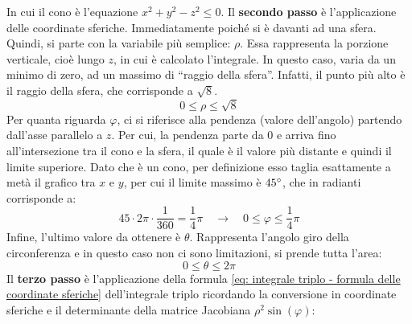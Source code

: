 \documentclass[a4paper]{article}
\newcommand{\dquotes}[1]{``#1''}
\begin{document}
	\noindent
	In cui il cono è l'equazione $x^{2} + y^{2} - z^{2} \le 0$. Il \textbf{secondo passo} è l'applicazione delle coordinate sferiche. Immediatamente poiché si è davanti ad una sfera. Quindi, si parte con la variabile più semplice: $\rho$. Essa rappresenta la porzione verticale, cioè lungo $z$, in cui è calcolato l'integrale. In questo caso, varia da un minimo di zero, ad un massimo di \dquotes{raggio della sfera}. Infatti, il punto più alto è il raggio della sfera, che corrisponde a $\sqrt{8}$.
	\begin{equation*}
		0 \le \rho \le \sqrt{8}
	\end{equation*}
	Per quanta riguarda $\varphi$, ci si riferisce alla pendenza (valore dell'angolo) partendo dall'asse parallelo a $z$. Per cui, la pendenza parte da $0$ e arriva fino all'intersezione tra il cono e la sfera, il quale è il valore più distante e quindi il limite superiore. Dato che è un cono, per definizione esso taglia esattamente a metà il grafico tra $x$ e $y$, per cui il limite massimo è $45\degree$, che in radianti corrisponde a:
	\begin{equation*}
		45 \cdot 2\pi \cdot \dfrac{1}{360} = \dfrac{1}{4}\pi 
		\hspace{1em} \longrightarrow \hspace{1em}
		0 \le \varphi \le \dfrac{1}{4}\pi
	\end{equation*}
	Infine, l'ultimo valore da ottenere è $\theta$. Rappresenta l'angolo giro della circonferenza e in questo caso non ci sono limitazioni, si prende tutta l'area:
	\begin{equation*}
		0 \le \theta \le 2\pi
	\end{equation*}
	Il \textbf{terzo passo} è l'applicazione della formula \ref{eq: integrale triplo - formula delle coordinate sferiche} dell'integrale triplo ricordando la conversione in coordinate sferiche e il determinante della matrice Jacobiana $\rho^{2} \sin\left(\varphi\right)$:
\end{document}

